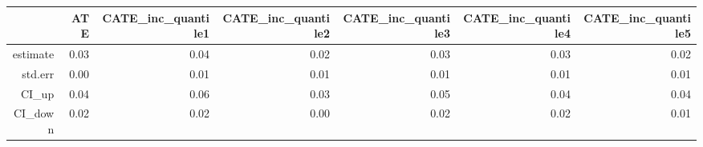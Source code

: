 \begin{table}[ht]
\centering
\begin{tabular}{rrrrrrr}
  \hline
 & ATE & CATE\_inc\_quantile1 & CATE\_inc\_quantile2 & CATE\_inc\_quantile3 & CATE\_inc\_quantile4 & CATE\_inc\_quantile5 \\ 
  \hline
estimate & 0.03 & 0.04 & 0.02 & 0.03 & 0.03 & 0.02 \\ 
  std.err & 0.00 & 0.01 & 0.01 & 0.01 & 0.01 & 0.01 \\ 
  CI\_up & 0.04 & 0.06 & 0.03 & 0.05 & 0.04 & 0.04 \\ 
  CI\_down & 0.02 & 0.02 & 0.00 & 0.02 & 0.02 & 0.01 \\ 
   \hline
\end{tabular}
\end{table}
